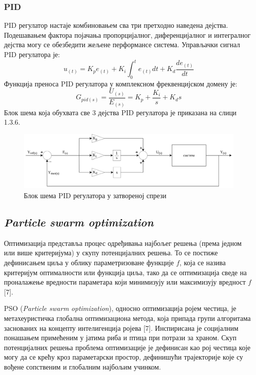 \documentclass[12pt]{article}
\begin{document}
\subsubsection{PID}
PID регулатор настаје комбиновањем сва три претходно наведена дејства. Подешавањем фактора појачања пропорцијалног, диференцијалног и интегралног дејства могу се обезбедити жељене перформансе система.
Управљачки сигнал PID регулатора је:
\begin{equation}
    u_{(t)} = K_p e_{(t)} + K_i\int_{0}^{t}e_{(t)}dt + K_d\dfrac{de_{(t)}}{dt}
\end{equation}
Функција преноса PID регулатора у комплексном фреквенцијском домену је:
\begin{equation}
    G_{pid(s)} = \dfrac{U_{(s)}}{E_{(s)}} = K_p + \dfrac{K_i}{s} + K_ds
\end{equation}
Блок шема која обухвата све 3 дејства PID регулатора је приказана на слици 1.3.6.
\begin{figure}[H]
    \centering
    \includegraphics[width=18cm]{figures/pid.drawio.png}
    \caption{Блок шема PID регулатора у затвореној спрези}
    \label{fig:PID_затворена_спрега}
\end{figure}

\subsection{\textit{Particle swarm optimization}}
Оптимизација представља процес одређивања најбољег решења (према једном или више критеријума) у скупу потенцијалних решења. То се постиже дефинисањем циља у облику параметризоване функције $f$, која се назива критеријум оптималности или функција циља, тако да се оптимизација сведе на проналажење вредности параметара који минимизују или максимизују вредност $f$ [7].

PSO (\textit{Particle swarm optimization}), односно оптимизација ројем честица, је метахеуристичка глобална оптимизациона метода, која припада групи алгоритама заснованих на концепту интелигенција ројева [7]. Инспирисана је социјалним понашањем примећеним у јатима риба и птица при потрази за храном. Скуп потенцијалних решења проблема оптимизације је дефинисан као рој честица које могу да се крећу кроз параметарски простор, дефинишући трајекторије које су вођене сопственим и глобалним најбољим учинком.
\end{document}

